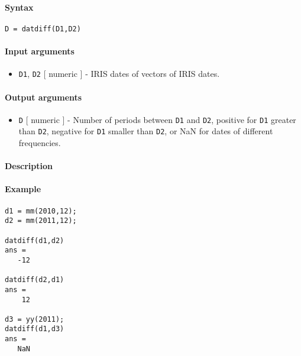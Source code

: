


	\paragraph{Syntax}

\begin{verbatim}
D = datdiff(D1,D2)
\end{verbatim}

\paragraph{Input arguments}

\begin{itemize}
\itemsep1pt\parskip0pt
\item
  \texttt{D1}, \texttt{D2} {[} numeric {]} - IRIS dates of vectors of
  IRIS dates.
\end{itemize}

\paragraph{Output arguments}

\begin{itemize}
\itemsep1pt\parskip0pt
\item
  \texttt{D} {[} numeric {]} - Number of periods between \texttt{D1} and
  \texttt{D2}, positive for \texttt{D1} greater than \texttt{D2},
  negative for \texttt{D1} smaller than \texttt{D2}, or NaN for dates of
  different frequencies.
\end{itemize}

\paragraph{Description}

\paragraph{Example}

\begin{verbatim}
d1 = mm(2010,12);
d2 = mm(2011,12);

datdiff(d1,d2)
ans =
   -12

datdiff(d2,d1)
ans =
    12

d3 = yy(2011);
datdiff(d1,d3)
ans =
   NaN
\end{verbatim}


